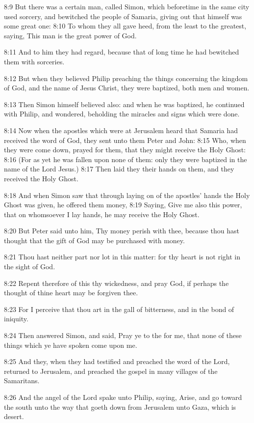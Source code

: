 8:9 But there was a certain man, called Simon, which beforetime in the
same city used sorcery, and bewitched the people of Samaria, giving
out that himself was some great one: 8:10 To whom they all gave heed,
from the least to the greatest, saying, This man is the great power of
God.

8:11 And to him they had regard, because that of long time he had
bewitched them with sorceries.

8:12 But when they believed Philip preaching the things concerning the
kingdom of God, and the name of Jesus Christ, they were baptized, both
men and women.

8:13 Then Simon himself believed also: and when he was baptized, he
continued with Philip, and wondered, beholding the miracles and signs
which were done.

8:14 Now when the apostles which were at Jerusalem heard that Samaria
had received the word of God, they sent unto them Peter and John: 8:15
Who, when they were come down, prayed for them, that they might
receive the Holy Ghost: 8:16 (For as yet he was fallen upon none of
them: only they were baptized in the name of the Lord Jesus.)  8:17
Then laid they their hands on them, and they received the Holy Ghost.

8:18 And when Simon saw that through laying on of the apostles' hands
the Holy Ghost was given, he offered them money, 8:19 Saying, Give me
also this power, that on whomsoever I lay hands, he may receive the
Holy Ghost.

8:20 But Peter said unto him, Thy money perish with thee, because thou
hast thought that the gift of God may be purchased with money.

8:21 Thou hast neither part nor lot in this matter: for thy heart is
not right in the sight of God.

8:22 Repent therefore of this thy wickedness, and pray God, if perhaps
the thought of thine heart may be forgiven thee.

8:23 For I perceive that thou art in the gall of bitterness, and in
the bond of iniquity.

8:24 Then answered Simon, and said, Pray ye to the \LORD for me, that
none of these things which ye have spoken come upon me.

8:25 And they, when they had testified and preached the word of the
Lord, returned to Jerusalem, and preached the gospel in many villages
of the Samaritans.

8:26 And the angel of the Lord spake unto Philip, saying, Arise, and
go toward the south unto the way that goeth down from Jerusalem unto
Gaza, which is desert.

